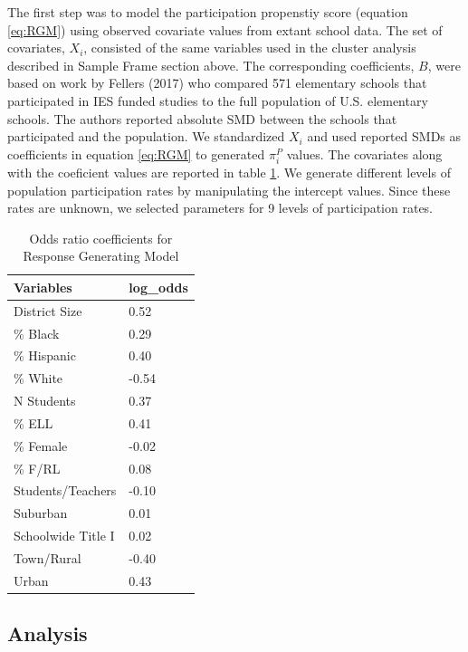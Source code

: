 \documentclass[man,floatsintext]{apa6}
\begin{document}
The first step was to model the participation propenstiy score (equation \eqref{eq:RGM}) using observed covariate values from extant school data. The set of covariates, \(X_i\), consisted of the same variables used in the cluster analysis described in Sample Frame section above. The corresponding coefficients, \(B\), were based on work by Fellers (2017) who compared 571 elementary schools that participated in IES funded studies to the full population of U.S. elementary schools. The authors reported absolute SMD between the schools that participated and the population. We standardized \(X_i\) and used reported SMDs as coefficients in equation \eqref{eq:RGM} to generated \(\pi^P_i\) values. The covariates along with the coeficient values are reported in table \ref{tab:tab-RGM-Pars}. We generate different levels of population participation rates by manipulating the intercept values. Since these rates are unknown, we selected parameters for 9 levels of participation rates.

\begin{table}[tbp]
\begin{center}
\begin{threeparttable}
\caption{\label{tab:tab-RGM-Pars}Odds ratio coefficients for Response Generating Model}
\begin{tabular}{ll}
\toprule
Variables & \multicolumn{1}{c}{log\_odds}\\
\midrule
District Size & 0.52\\
\% Black & 0.29\\
\% Hispanic & 0.40\\
\% White & -0.54\\
N Students & 0.37\\
\% ELL & 0.41\\
\% Female & -0.02\\
\% F/RL & 0.08\\
Students/Teachers & -0.10\\
Suburban & 0.01\\
Schoolwide Title I & 0.02\\
Town/Rural & -0.40\\
Urban & 0.43\\
\bottomrule
\end{tabular}
\end{threeparttable}
\end{center}
\end{table}



\hypertarget{analysis}{%
\subsection{Analysis}\label{analysis}}
\end{document}
